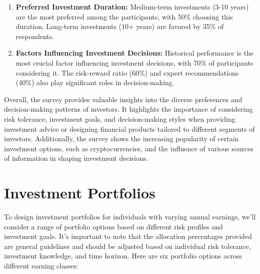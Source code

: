 \begin{enumerate}
  \item \textbf{Preferred Investment Duration:} Medium-term investments (3-10 years) are the most preferred among the participants, with 50\% choosing this duration. Long-term investments (10+ years) are favored by 35\% of respondents.
  
  \item \textbf{Factors Influencing Investment Decisions:} Historical performance is the most crucial factor influencing investment decisions, with 70\% of participants considering it. The risk-reward ratio (60\%) and expert recommendations (40\%) also play significant roles in decision-making.
\end{enumerate}

Overall, the survey provides valuable insights into the diverse preferences and decision-making patterns of investors. It highlights the importance of considering risk tolerance, investment goals, and decision-making styles when providing investment advice or designing financial products tailored to different segments of investors. Additionally, the survey shows the increasing popularity of certain investment options, such as cryptocurrencies, and the influence of various sources of information in shaping investment decisions.

\section{Investment Portfolios}

To design investment portfolios for individuals with varying annual earnings, we'll consider a range of portfolio options based on different risk profiles and investment goals. It's important to note that the allocation percentages provided are general guidelines and should be adjusted based on individual risk tolerance, investment knowledge, and time horizon. Here are six portfolio options across different earning classes:

